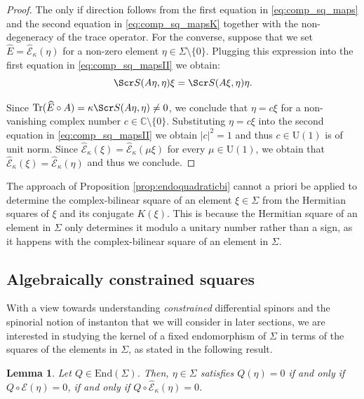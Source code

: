 \documentclass[10pt,a4paper,twoside,reqno]{amsart}
\theoremstyle{plain}
\newtheorem{lemma}[thm]{Lemma}
\theoremstyle{definition}
\theoremstyle{remark}
\newcommand{\End}{\mathrm{End}}
\def\C{\mathbb{C}}
\newcommand{\Tr}{\mathrm{Tr}}
\def\scS{\Scr S}
\def\U{\mathrm{U}}
\def\cE{\mathcal{E}}
\def\hcE{\widehat{\mathcal{E}}}
\newcommand{\abs}[1]{\left\lvert#1\right\rvert}
\begin{document}
\begin{proof}
The only if direction follows from the first equation in \eqref{eq:comp_sq_maps} and the second equation in \eqref{eq:comp_sq_mapsK} together with the non-degeneracy of the trace operator. For the converse, suppose that we set $\widehat{E} = \hcE_\kappa(\eta)$ for a non-zero element $\eta \in \Sigma\setminus\{0\}$. Plugging this expression into the first equation in \eqref{eq:comp_sq_mapsII} we obtain:
\begin{equation*}
\scS(A \eta , \eta)\xi = \scS(A \xi , \eta) \eta.
\end{equation*}

\noindent
Since $\Tr (\widehat{E} \circ A ) = \kappa\scS(A\eta,\eta) \neq 0$, we conclude that $\eta = c \xi$ for a non-vanishing complex number $c\in\C\setminus\{0\}$. Substituting $\eta = c \xi$  into the second equation in \eqref{eq:comp_sq_mapsII} we obtain $\abs{c}^2 = 1$ and thus $c \in \U(1)$ is of unit norm. Since $\hcE_\kappa(\xi) = \hcE_\kappa(\mu\xi)$ for every $\mu\in\U(1)$, we obtain that $\hcE_\kappa(\xi) = \hcE_\kappa(\eta)$ and thus we conclude. 
\end{proof}

\noindent
The approach of Proposition \ref{prop:endoquadraticbi} cannot a priori be applied to determine the complex-bilinear square of an element $\xi\in\Sigma$ from the Hermitian squares of $\xi$ and its conjugate $K(\xi)$. This is because the Hermitian square of an element in $\Sigma$ only determines it modulo a unitary number rather than a sign, as it happens with the complex-bilinear square of an element in $\Sigma$.


\subsection{Algebraically constrained squares}
\label{subsec:constrainedsquares}


With a view towards understanding \emph{constrained} differential spinors and the spinorial notion of instanton that we will consider in later sections, we are interested in studying the kernel of a fixed endomorphism of $\Sigma$ in terms of the squares of the elements in $\Sigma$, as stated in the following result. 

\begin{lemma}
\label{lemma:constrainedvector}
Let $Q\in \End(\Sigma)$. Then, $\eta\in \Sigma$ satisfies $Q(\eta) = 0$ if and only if $Q\circ \cE(\eta) = 0$, if and only if $Q\circ \hcE_{\kappa}(\eta) = 0$.
\end{lemma}
 
\end{document}
